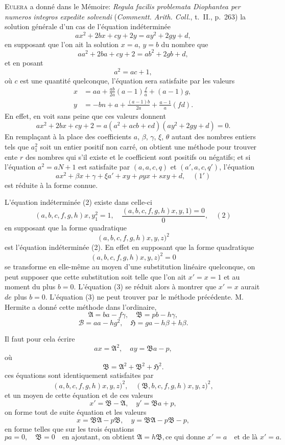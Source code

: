 \documentclass[12pt,a4paper]{article}
\theoremstyle{definition}
\begin{document}
\bigskip

E\textsc{ulera} a donn\'e dans le M\'emoire: \textit{Regula facilis problemata Diophantea per numeros
integros expedite solvendi} (\textit{Commentt. Arith. Coll.}, t.~II., p.~263) la solution g\'en\'erale d'un cas
de l'\'equation ind\'etermin\'ee
\[
ax^2 + 2bx + cy + 2y = ay^2 + 2gy + d,
\]
en supposant que l'on ait la solution $x = a$, $y = b$ du nombre que
\[
aa^2 + 2ba + cy + 2 = ab^2 + 2gb + d,
\]
et en posant
\[
a^2 = ac + 1,
\]
o\`u $c$ est une quantit\'e quelconque, l'\'equation sera satisfaite par les valeurs
\begin{align*}
x &= aa + \frac{ab}{2a}(a-1)\frac{f}{a} + (a-1)g,\\
y &= -bn + a + \frac{(a-1)b}{2a} + \frac{a-1}{a}(fd).
\end{align*}
En effet, en voit sans peine que ces valeurs donnent
\[
ax^2 + 2bx + cy + 2 = a(a^2 + acb + ed) (ay^2 + 2gy + d) = 0.
\]
En rempla\c{c}ant \`a la place des coefficients $a$, $\beta$, $\gamma$, $\xi$, $\theta$ autant des nombres entiers
tels que $a_1^2$ soit un entier positif non carr\'e, on obtient une m\'ethode pour trouver
ente $r$ des nombres qui s'il existe et le coefficient sont positifs ou n\'egatifs; et si l'\'equation
$a^2 = aN + 1$ est satisfaite par $(a, a, c, q)$ et $(a', a, c, q')$, l'\'equation
\[
ax^2 + \beta x + \gamma + \xi a' + xy + \rho yx + s xy + d, \quad (1')
\]
est r\'eduite \`a la forme connue.

L'\'equation ind\'etermin\'ee (2) existe dans celle-ci
\[
(a, b, c, f, g, h)x, y_1^2 = 1, \quad \frac{(a, b, c, f, g, h)x, y, 1) = 0}{0}, \quad (2)
\]
en supposant que la forme quadratique
\[
(a, b, c, f, g, h)x, y, z)^2
\]
est l'\'equation ind\'etermin\'ee (2). En effet en supposant que la forme quadratique
\[
(a, b, c, f, g, h)x, y, z)^2 = 0
\]
se transforme en elle-m\^eme au moyen d'une substitution lin\'eaire quelconque, on peut
supposer que cette substitution soit telle que l'on ait
$x' = x = 1$ et au moment du plus $b = 0$. L'\'equation (3) se r\'eduit alors \`a montrer
que $x' = x$ aurait $de$ plus $b = 0$. L'\'equation (3) ne peut trouver par le m\'ethode pr\'ec\'edente. M. Hermite
a donn\'e cette m\'ethode dans l'ordinaire,
\[
\mathfrak{A} = ba - f\gamma, \quad \mathfrak{B} = pb - h\gamma,
\]
\[
\mathcal{B} = aa - hg^2, \quad \mathfrak{H} = ga - h\beta + h\beta.
\]

\medskip

Il faut pour cela \'ecrire
\[
ax = \mathfrak{A}^2, \quad ay = \mathfrak{B} a - p,
\]
o\`u
\[
\mathfrak{B} = \mathfrak{A}^2 + \mathfrak{B}^2 + \mathfrak{H}^2.
\]
ces \'equations sont identiquement satisfaites par
\[
(a, b, c, f, g, h)x, y, z)^2, \quad (\mathfrak{B}, b, c, f, g, h)x, y, z)^2,
\]
et un moyen de cette \'equation et de ces valeurs
\[
x' = \mathfrak{B} - \mathfrak{A}, \quad y' = \mathfrak{B} a + p,
\]
on forme tout de suite \'equation et les valeurs
\[
x = \mathfrak{B} \mathfrak{A} - p \mathfrak{B}, \quad y = \mathfrak{B} \mathfrak{A} - p \mathfrak{B} - p,
\]
en forme telles que sur les trois \'equations
\[
pa = 0, \quad \mathfrak{B} = 0 \quad \text{en ajoutant, on obtient } \mathfrak{A} = h\mathfrak{B}, \text{ce qui donne } x' = a \quad \text{et de l\`a } x' = a.
\]
\end{document}
